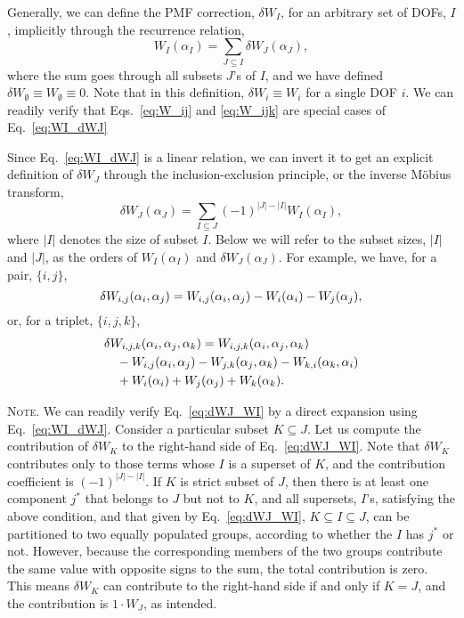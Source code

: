 \documentclass[preprint, superscriptaddress]{revtex4-1}
\newcommand{\note}[1]{{\color{DarkGreen}\footnotesize \textsc{Note.} #1}}
\begin{document}
Generally, we can define the PMF correction, $\delta W_I$,
for an arbitrary set of DOFs, $I$,
implicitly through the recurrence relation,
%
\begin{equation}
  W_I(\alpha_I)
  =
  \sum_{J \subseteq I}
  \delta W_J(\alpha_J)
  ,
  \label{eq:WI_dWJ}
\end{equation}
%
where the sum goes through all subsets $J$'s of $I$,
and we have defined
$\delta W_\emptyset \equiv W_\emptyset \equiv 0$.
%
Note that in this definition,
$\delta W_i \equiv W_i$
for a single DOF $i$.
%
We can readily verify that
Eqs.~\eqref{eq:W_ij} and \eqref{eq:W_ijk}
are special cases of Eq.~\eqref{eq:WI_dWJ}

Since Eq.~\eqref{eq:WI_dWJ} is a linear relation,
we can invert it to get an explicit definition of $\delta W_J$
through the inclusion-exclusion principle, or the inverse M\"{o}bius transform\cite{bjorklund2007},
%
\begin{equation}
  \delta W_J(\alpha_J)
  =
  \sum_{I \subseteq J}
  (-1)^{|J| - |I|}
  W_I(\alpha_I)
  ,
  \label{eq:dWJ_WI}
\end{equation}
%
where $|I|$ denotes the size of subset $I$.
%
Below we will refer to the subset sizes, $|I|$ and $|J|$,
as the orders of $W_I(\alpha_I)$ and $\delta W_J(\alpha_J)$.
%
For example, we have, for a pair, $\{i, j\}$,
%
\begin{equation}
  \delta W_{i,j}(\alpha_i, \alpha_j)
  =
  W_{i,j}(\alpha_i, \alpha_j)
  - W_{i}(\alpha_i) - W_{j}(\alpha_j)
  ,
  \notag
\end{equation}
%
or, for a triplet, $\{i, j, k\}$,
%
\begin{align*}
  &\delta W_{i,j,k}(\alpha_i, \alpha_j, \alpha_k)
  =
  W_{i,j,k}(\alpha_i, \alpha_j, \alpha_k)
  \notag\\
  &\quad
  - W_{i,j}(\alpha_i, \alpha_j)
  - W_{j,k}(\alpha_j, \alpha_k)
  - W_{k,i}(\alpha_k, \alpha_i)
  \notag\\
  &\quad
  + W_i(\alpha_i)
  + W_j(\alpha_j)
  + W_k(\alpha_k)
  .
\end{align*}

\note{
We can readily verify Eq.~\eqref{eq:dWJ_WI}
by a direct expansion using Eq.~\eqref{eq:WI_dWJ}.
%
Consider a particular subset $K \subseteq J$.
Let us compute the contribution of $\delta W_K$
to the right-hand side of Eq.~\eqref{eq:dWJ_WI}.
%
Note that $\delta W_K$ contributes only to those terms
whose $I$ is a superset of $K$,
and the contribution coefficient is $(-1)^{|J|-|I|}$.
%
If $K$ is strict subset of $J$,
then there is at least one component $j^*$ that belongs to $J$
but not to $K$,
and all supersets, $I$'s,
satisfying the above condition, and that given by Eq.~\eqref{eq:dWJ_WI},
$K \subseteq I \subseteq J$,
can be partitioned to two equally populated groups,
according to whether the $I$ has $j^*$ or not.
%
However, because the corresponding members of the two groups
contribute the same value with opposite signs to the sum,
the total contribution is zero.
%
This means $\delta W_K$ can contribute to the right-hand side
if and only if $K = J$, and the contribution is $1 \cdot W_J$,
as intended.
}
\end{document}
